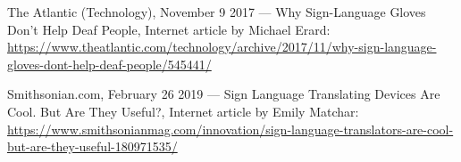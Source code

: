 %
%
% 
% 
%

\begin{thebibliography}{99.}

 The Atlantic (Technology), 
November 9 2017 --- Why Sign-Language Gloves Don't Help Deaf People, 
Internet article by Michael Erard: \url{https://www.theatlantic.com/technology/archive/2017/11/why-sign-language-gloves-dont-help-deaf-people/545441/}

 Smithsonian.com, 
February 26 2019 --- Sign Language Translating Devices Are Cool. But Are They Useful?, 
Internet article by Emily Matchar: \url{https://www.smithsonianmag.com/innovation/sign-language-translators-are-cool-but-are-they-useful-180971535/}

\end{thebibliography}
